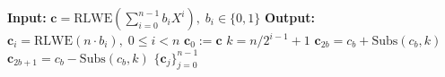 \begin{algorithm}[ht!]
\caption{expandRlwe}
\label{alg:ORAM:3}
\begin{algorithmic}[1]
    \State \textbf{Input:} $\mathbf{c} = \mathrm{RLWE}(\sum_{i=0}^{n-1} b_i X^i),\;b_i\in\{0,1\}$
    \State \textbf{Output:} $\mathbf{c}_i = \mathrm{RLWE}(n\cdot b_i),\; 0 \leq i < n$
    \State $\mathbf{c}_0 := \mathbf{c}$
        \State $k = n/2^{i - 1} + 1$
            \State $\mathbf{c}_{2b} = c_b + \mathrm{Subs}(c_b, k)$
            \State $\mathbf{c}_{2b + 1} = c_b - \mathrm{Subs}(c_b, k)$
        \EndFor
    \EndFor
    \State\Return $\{\mathbf{c}_j\}^{n-1}_{j=0}$
\end{algorithmic}
\end{algorithm}
